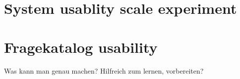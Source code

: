 \section{\label{sec::Features}System usablity scale experiment}

\section{\label{sec::Features}Fragekatalog usability}
Was kann man genau machen? Hilfreich zum lernen, vorbereiten?


